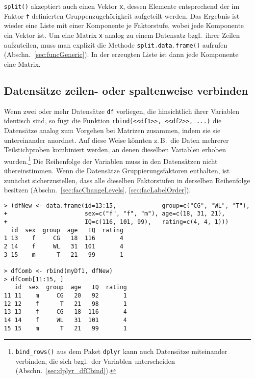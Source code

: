 \lstinline!split()! akzeptiert auch einen Vektor \lstinline!x!, dessen Elemente entsprechend der im Faktor \lstinline!f! definierten Gruppenzugehörigkeit aufgeteilt werden. Das Ergebnis ist wieder eine Liste mit einer Komponente je Faktorstufe, wobei jede Komponente ein Vektor ist. Um eine Matrix \lstinline!x! analog zu einem Datensatz bzgl.\ ihrer Zeilen aufzuteilen, muss man explizit die Methode \lstinline!split.data.frame()! aufrufen (Abschn.\ \ref{sec:funcGeneric}). In der erzeugten Liste ist dann jede Komponente eine Matrix.

\subsection{Datensätze zeilen- oder spaltenweise verbinden}
\label{sec:dfCbind}

Wenn zwei oder mehr Datensätze \lstinline!df! vorliegen, die hinsichtlich ihrer Variablen identisch sind, so fügt die Funktion \lstinline!rbind(<<df1>>, <<df2>>, ...)! die Datensätze analog zum Vorgehen bei Matrizen zusammen, indem sie sie untereinander anordnet. Auf diese Weise könnten z.\,B.\ die Daten mehrerer Teilstichproben kombiniert werden, an denen dieselben Variablen erhoben wurden.\footnote{\lstinline!bind_rows()! aus dem Paket \lstinline!dplyr! kann auch Datensätze miteinander verbinden, die sich bzgl.\ der Variablen unterscheiden (Abschn.\ \ref{sec:dplyr_dfCbind}).} Die Reihenfolge der Variablen muss in den Datensätzen nicht übereinstimmen. Wenn die Datensätze Gruppierungsfaktoren enthalten, ist zunächst sicherzustellen, dass alle dieselben Faktorstufen in derselben Reihenfolge besitzen (Abschn.\ \ref{sec:facChangeLevels}, \ref{sec:facLabelOrder}).
\begin{lstlisting}
> (dfNew <- data.frame(id=13:15,             group=c("CG", "WL", "T"),
+                      sex=c("f", "f", "m"), age=c(18, 31, 21),
+                      IQ=c(116, 101, 99),   rating=c(4, 4, 1)))
  id  sex  group  age   IQ  rating
1 13    f     CG   18  116       4
2 14    f     WL   31  101       4
3 15    m      T   21   99       1

> dfComb <- rbind(myDf1, dfNew)
> dfComb[11:15, ]
   id  sex  group  age   IQ  rating
11 11    m     CG   20   92       1
12 12    f      T   21   98       1
13 13    f     CG   18  116       4
14 14    f     WL   31  101       4
15 15    m      T   21   99       1
\end{lstlisting}

